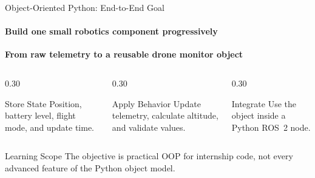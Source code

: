 \begin{frame}{Object-Oriented Python: End-to-End Goal}
\framesubtitle{Build one small robotics component progressively}

\begin{center}
    \Large
    \textbf{From raw telemetry to a reusable drone monitor object}
\end{center}

\pause

\begin{columns}[T,onlytextwidth]
    \begin{column}{0.30\textwidth}
        \begin{block}{Store State}
            Position, battery level, flight mode, and update time.
        \end{block}
    \end{column}
    \hfill
    \begin{column}{0.30\textwidth}
        \begin{block}{Apply Behavior}
            Update telemetry, calculate altitude, and validate values.
        \end{block}
    \end{column}
    \hfill
    \begin{column}{0.30\textwidth}
        \begin{block}{Integrate}
            Use the object inside a Python ROS~2 node.
        \end{block}
    \end{column}
\end{columns}

\begin{alertblock}{Learning Scope}
    The objective is practical OOP for internship code, not every advanced
    feature of the Python object model.
\end{alertblock}
\end{frame}


